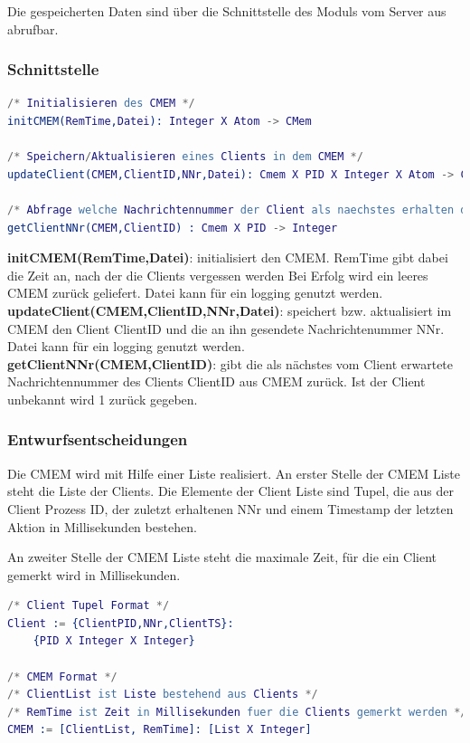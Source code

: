 \documentclass{article}
\begin{document}
Die gespeicherten Daten sind über die Schnittstelle des Moduls vom Server aus abrufbar.

\subsubsection{Schnittstelle}
\begin{lstlisting}[language=erlang]
/* Initialisieren des CMEM */
initCMEM(RemTime,Datei): Integer X Atom -> CMem

/* Speichern/Aktualisieren eines Clients in dem CMEM */
updateClient(CMEM,ClientID,NNr,Datei): Cmem X PID X Integer X Atom -> CMem

/* Abfrage welche Nachrichtennummer der Client als naechstes erhalten darf */
getClientNNr(CMEM,ClientID) : Cmem X PID -> Integer
\end{lstlisting}

\textbf{initCMEM(RemTime,Datei)}: initialisiert den CMEM. RemTime gibt dabei die Zeit an, nach der die Clients vergessen werden Bei Erfolg wird ein leeres CMEM zurück geliefert. Datei kann für ein logging genutzt werden.\\

\textbf{updateClient(CMEM,ClientID,NNr,Datei)}: speichert bzw. aktualisiert im CMEM den Client ClientID und die an ihn gesendete Nachrichtenummer NNr. Datei kann für ein logging genutzt werden.\\

\textbf{getClientNNr(CMEM,ClientID)}: gibt die als nächstes vom Client erwartete Nachrichtennummer des Clients ClientID aus CMEM zurück. Ist der Client unbekannt wird 1 zurück gegeben.\\

\subsubsection{Entwurfsentscheidungen}
Die CMEM wird mit Hilfe einer Liste realisiert. An erster Stelle der CMEM Liste steht die Liste der Clients. Die Elemente der Client Liste sind Tupel, die aus der Client Prozess ID, der zuletzt erhaltenen NNr und einem Timestamp der letzten Aktion in Millisekunden bestehen.

An zweiter Stelle der CMEM Liste steht die maximale Zeit, für die ein Client gemerkt wird in Millisekunden.

\begin{lstlisting}[language=erlang]
/* Client Tupel Format */
Client := {ClientPID,NNr,ClientTS}:
    {PID X Integer X Integer}

/* CMEM Format */
/* ClientList ist Liste bestehend aus Clients */
/* RemTime ist Zeit in Millisekunden fuer die Clients gemerkt werden */
CMEM := [ClientList, RemTime]: [List X Integer]
\end{lstlisting}
\end{document}
